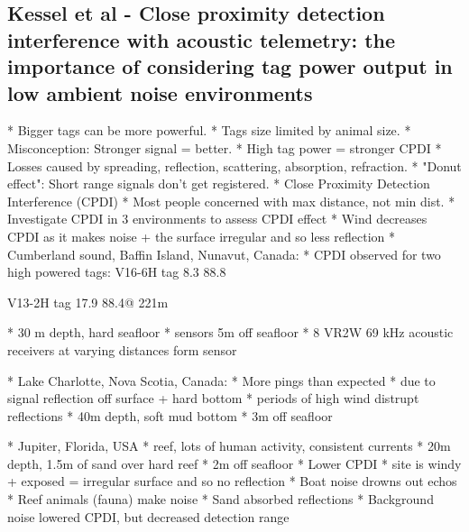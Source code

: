 \subsection{Kessel et al - Close proximity detection interference with acoustic telemetry: the importance of considering tag power output in low ambient noise environments}
* Bigger tags can be more powerful.  
* Tags size limited by animal size.  
* Misconception: Stronger signal = better.
* High tag power = stronger CPDI
* Losses caused by spreading, reflection, scattering, absorption, refraction.
* "Donut effect": Short range signals don't get registered.
* Close Proximity Detection Interference (CPDI)
* Most people concerned with max distance, not min dist.
* Investigate CPDI in 3 environments to assess CPDI effect
* Wind decreases CPDI as it makes noise + the surface irregular and so less reflection
* Cumberland sound, Baffin Island, Nunavut, Canada: 
* CPDI observed for two high powered tags: 
V16-6H tag
8.3%
88.8%

V13-2H tag
17.9%
88.4@ 221m

* 30 m depth, hard seafloor
* sensors 5m off seafloor
* 8 VR2W 69 kHz acoustic receivers at varying distances form sensor


* Lake Charlotte, Nova Scotia, Canada:
* More pings than expected
* due to signal reflection off surface + hard bottom
* periods of high wind distrupt reflections
* 40m depth, soft mud bottom
* 3m off seafloor

* Jupiter, Florida, USA
* reef, lots of human activity, consistent currents	
* 20m depth, 1.5m of sand over hard reef
* 2m off seafloor
* Lower CPDI 
* site is windy + exposed = irregular surface and so no reflection
* Boat noise drowns out echos
* Reef animals (fauna) make noise
* Sand absorbed reflections
* Background noise lowered CPDI, but decreased detection range


